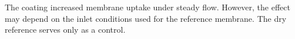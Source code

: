 The coating increased membrane uptake under steady flow.
However, the effect may depend on the inlet conditions used for the reference membrane.
The dry reference serves only as a control.
